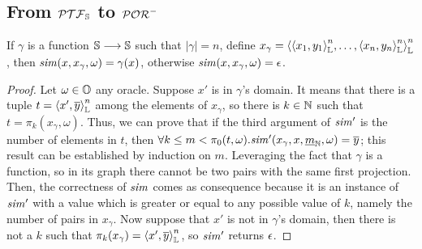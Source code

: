 






































\subsection{From $\polyF$ to $\POR^-$}
\label{app:secg}











\begin{lemma}
  \label{lemma:simcorr}
  If $\gamma$ is a function $\Ss \longrightarrow \Ss$ such that $|\gamma|=n$,
   define $x_\gamma = \listenc {\listenc {x_1, y_1} 2, \ldots,
  \listenc {x_n, y_n} 2} n$,  then
  $\simulate(x, x_\gamma, \omega)=\gamma(x)$,
  otherwise $\simulate(x, x_\gamma, \omega)=\eepsilon$.
\end{lemma}
\begin{proof}
  Let $\omega \in \Os$ any oracle.
  Suppose $x'$ is in $\gamma$'s domain. It means that there is a tuple
  $t=\listenc{x', \overline y} 2$ among the elements of $x_\gamma$, so there is
  $k \in \Nat$ such that $t=\pi_k(x_\gamma, \omega)$.
  Thus, we can prove that if the third argument of $\simulate'$
  is the number of elements in $t$, then
  $\forall k\le m < \pi_0 (t, \omega). \simulate'(x_\gamma, x,
  \ovverline m \Nat, \omega)=\overline y$; this result can be established by induction
  on $m$. Leveraging the fact that $\gamma$ is a function, so in its graph there
  cannot be two pairs with the same first projection.
  Then, the correctness of $\simulate$ comes as consequence because it is
  an instance of $\simulate'$ with a value which is greater or equal to any
  possible value of $k$, namely the number of pairs in $x_\gamma$.
  Now suppose that $x'$ is not in $\gamma$'s domain,
  then there is not a $k$ such that
  $\pi_k(x_\gamma)=\listenc{x', \overline y} 2$, so $\simulate'$ returns
  $\eepsilon$.
\end{proof}

